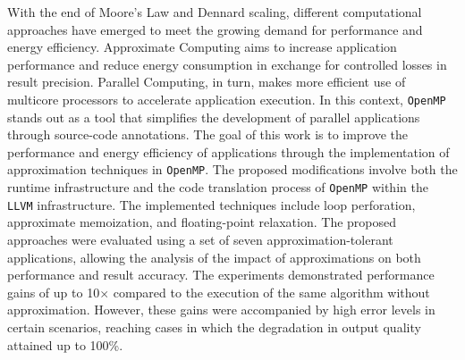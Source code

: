 \begin{abstractutfpr}%
With the end of Moore's Law and Dennard scaling, different computational approaches have emerged to meet the growing demand for performance and energy efficiency. Approximate Computing aims to increase application performance and reduce energy consumption in exchange for controlled losses in result precision. Parallel Computing, in turn, makes more efficient use of multicore processors to accelerate application execution. In this context, \texttt{OpenMP} stands out as a tool that simplifies the development of parallel applications through source-code annotations. The goal of this work is to improve the performance and energy efficiency of applications through the implementation of approximation techniques in \texttt{OpenMP}. The proposed modifications involve both the runtime infrastructure and the code translation process of \texttt{OpenMP} within the \texttt{LLVM} infrastructure. The implemented techniques include loop perforation, approximate memoization, and floating-point relaxation. The proposed approaches were evaluated using a set of seven approximation-tolerant applications, allowing the analysis of the impact of approximations on both performance and result accuracy. The experiments demonstrated performance gains of up to 10$\times$ compared to the execution of the same algorithm without approximation. However, these gains were accompanied by high error levels in certain scenarios, reaching cases in which the degradation in output quality attained up to 100\%.
\end{abstractutfpr}

